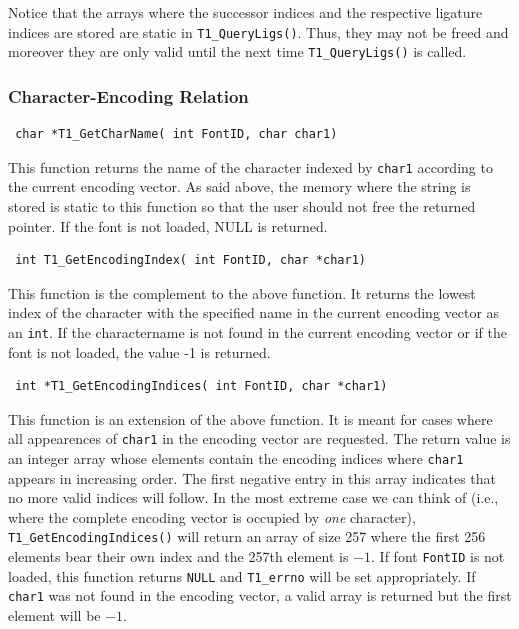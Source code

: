 Notice that the arrays where the successor indices and the respective
ligature indices are stored are static in
\verb+T1_QueryLigs()+. Thus, they may not be freed and moreover they
are only valid until the next time \verb+T1_QueryLigs()+ is called.


\subsubsection{Character-Encoding Relation}
\label{characterencodingrelation}%

\precorr
\begin{verbatim}
 char *T1_GetCharName( int FontID, char char1)
\end{verbatim}\postcorr
This function returns the name of the character indexed by \verb+char1+
according to the current encoding vector. As said above, the memory where the
string 
is stored is static to this function so that the user should not free the
returned pointer. If the font is not loaded, NULL is returned.

\precorr
\begin{verbatim}
 int T1_GetEncodingIndex( int FontID, char *char1)
\end{verbatim}\postcorr
This function is the complement to the above function. It returns the lowest
index of the character with the specified name in the current encoding vector
as an \verb+int+. If the charactername is not found in the current encoding
vector or if the font is not loaded, the value -1 is returned.

\precorr
\begin{verbatim}
 int *T1_GetEncodingIndices( int FontID, char *char1)
\end{verbatim}\postcorr
This function is an extension of the above function. It is meant for cases
where all appearences of \verb+char1+ in the encoding vector are requested.
The return value is an integer array whose elements contain the encoding
indices where \verb+char1+ appears in increasing order. The first negative
entry in this array indicates that no more valid indices will follow. In the
most extreme case we can think of (i.e., where the complete encoding vector is
occupied by {\em one} character), \verb+T1_GetEncodingIndices()+ will return
an array of size 257 where the first 256 elements bear their own index and the
257th element is $-1$. If font \verb+FontID+ is not loaded, this function
returns \verb+NULL+ and \verb+T1_errno+ will be set appropriately. If
\verb+char1+ was not found in the encoding vector, a valid array is returned
but the first element will be $-1$.


